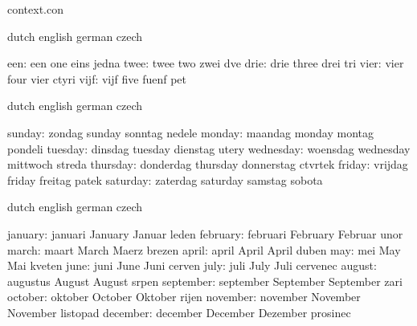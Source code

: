 


\startlogginginterface context.con



\startvariables       dutch   english   german   czech

                een:  een     one       eins     jedna
               twee:  twee    two       zwei     dve
               drie:  drie    three     drei     tri
               vier:  vier    four      vier     ctyri
               vijf:  vijf    five      fuenf    pet

\stopvariables




\startvariables  dutch       english     german       czech

        sunday:  zondag      sunday      sonntag      nedele
        monday:  maandag     monday      montag       pondeli
       tuesday:  dinsdag     tuesday     dienstag     utery
     wednesday:  woensdag    wednesday   mittwoch     streda
      thursday:  donderdag   thursday    donnerstag   ctvrtek
        friday:  vrijdag     friday      freitag      patek
      saturday:  zaterdag    saturday    samstag      sobota

\stopvariables

\startvariables  dutch       english     german      czech

       january:  januari     January     Januar      leden
      february:  februari    February    Februar     unor
         march:  maart       March       Maerz       brezen
         april:  april       April       April       duben
           may:  mei         May         Mai         kveten
          june:  juni        June        Juni        cerven
          july:  juli        July        Juli        cervenec
        august:  augustus    August      August      srpen
     september:  september   September   September   zari
       october:  oktober     October     Oktober     rijen
      november:  november    November    November    listopad
      december:  december    December    Dezember    prosinec

